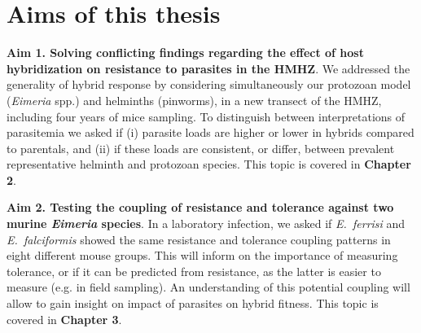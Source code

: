 \section{Aims of this thesis}
\textbf{Aim 1. Solving conflicting findings regarding the effect of host hybridization on resistance to parasites in the HMHZ}. We addressed the generality of hybrid response by considering simultaneously our protozoan model (\textit{Eimeria} spp.) and helminths (pinworms), in a new transect of the HMHZ, including four years of mice sampling. To distinguish between interpretations of parasitemia we asked if (i) parasite loads are higher or lower in hybrids compared to parentals, and (ii) if these loads are consistent, or differ, between prevalent representative helminth and protozoan species. This topic is covered in \textbf{Chapter 2}.
\par
\textbf{Aim 2. Testing the coupling of resistance and tolerance against two murine \textit{Eimeria} species}. In a laboratory infection, we asked if \textit{E.~ferrisi} and \textit{E.~falciformis} showed the same resistance and tolerance coupling patterns in eight different mouse groups. This will inform on the importance of measuring tolerance, or if it can be predicted from resistance, as the latter is easier to measure (e.g. in field sampling). An understanding of this potential coupling will allow to gain insight on impact of parasites on hybrid fitness. This topic is covered in \textbf{Chapter 3}.
